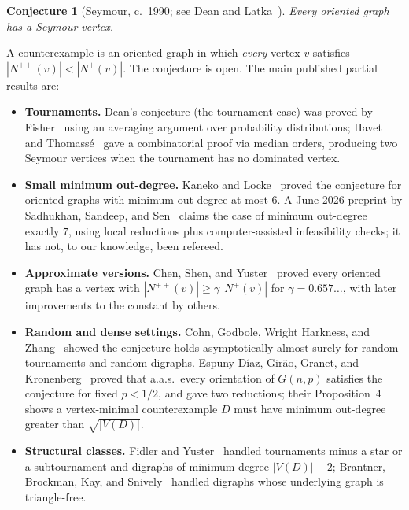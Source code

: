 \documentclass[11pt]{article}
\newtheorem{conjecture}{Conjecture}
\newcommand{\Nout}{N^{+}}
\newcommand{\Nsec}{N^{++}}
\begin{document}
\begin{conjecture}[Seymour, c.~1990; see Dean and Latka~\cite{DeanLatka95}]
\label{conj:ssnc}
Every oriented graph has a Seymour vertex.
\end{conjecture}

A counterexample is an oriented graph in which \emph{every} vertex $v$
satisfies $|\Nsec(v)| < |\Nout(v)|$. The conjecture is open. The main
published partial results are:

\begin{itemize}
\item \textbf{Tournaments.} Dean's conjecture (the tournament case) was
proved by Fisher~\cite{Fisher96} using an averaging argument over
probability distributions; Havet and Thomass\'e~\cite{HavetThomasse00} gave
a combinatorial proof via median orders, producing two Seymour vertices when
the tournament has no dominated vertex.
\item \textbf{Small minimum out-degree.} Kaneko and Locke~\cite{KanekoLocke01}
proved the conjecture for oriented graphs with minimum out-degree at most
$6$. A June 2026 preprint by Sadhukhan, Sandeep, and
Sen~\cite{SadhukhanSandeepSen26} claims the case of minimum out-degree
exactly $7$, using local reductions plus computer-assisted infeasibility
checks; it has not, to our knowledge, been refereed.
\item \textbf{Approximate versions.} Chen, Shen, and Yuster~\cite{ChenShenYuster03}
proved every oriented graph has a vertex with
$|\Nsec(v)| \ge \gamma\,|\Nout(v)|$ for $\gamma = 0.657\ldots$, with later
improvements to the constant by others.
\item \textbf{Random and dense settings.} Cohn, Godbole, Wright Harkness,
and Zhang~\cite{CohnGodbole16} showed the conjecture holds asymptotically
almost surely for random tournaments and random digraphs. Espuny D\'iaz,
Gir\~ao, Granet, and Kronenberg~\cite{EspunyDiaz25} proved that a.a.s.\
every orientation of $G(n,p)$ satisfies the conjecture for fixed $p<1/2$,
and gave two reductions; their Proposition~4 shows a vertex-minimal
counterexample $D$ must have minimum out-degree greater than
$\sqrt{|V(D)|}$.
\item \textbf{Structural classes.} Fidler and Yuster~\cite{FidlerYuster07}
handled tournaments minus a star or a subtournament and digraphs of minimum
degree $|V(D)|-2$; Brantner, Brockman, Kay, and Snively~\cite{Brantner09}
handled digraphs whose underlying graph is triangle-free.
\end{itemize}
\end{document}
